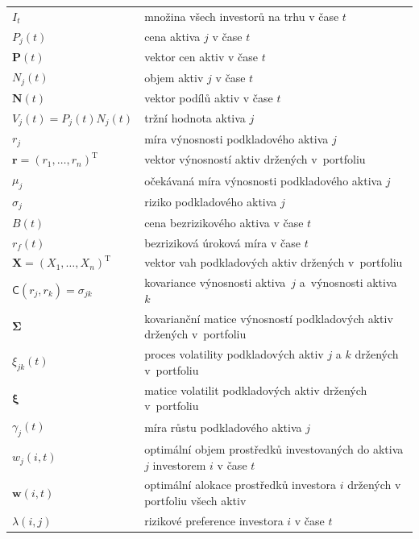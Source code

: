 \documentclass[a4paper,12pt]{report}
\theoremstyle{definition} \newtheorem{definice}[veta]{Definice}
\theoremstyle{remark}
\begin{document}
   \begin{tabular}{p{4cm} p{9.3cm}}
   $I_t$ 								& množina všech investorů na trhu v čase $t$\\
   $P_j(t)$                             &   cena aktiva $j$ v čase $t$ \\
   $\boldsymbol{P}(t)$                             &   vektor cen aktiv v čase $t$\\
   $N_j(t)$                             &   objem aktiv $j$ v čase $t$ \\
   $\boldsymbol{N}(t)$     &   vektor podílů aktiv v čase $t$\\
   $V_j(t)=P_j(t)N_j(t)$       &  tržní hodnota aktiva $j$\\
   $r_j$  								& míra výnosnosti podkladového aktiva $j$\\
   $\boldsymbol{r}=(r_1,\dots,r_n)^\mathrm{T}$  		& vektor výnosností aktiv držených v~portfoliu\\
   $\mu_j$ 								& očekávaná míra výnosnosti podkladového aktiva $j$\\
   $\sigma_j$								& riziko podkladového aktiva $j$\\
   $B(t)$ 								& cena bezrizikového aktiva v čase $t$\\
   $r_f(t)$ 								& bezriziková úroková míra v čase $t$\\
   $\boldsymbol{X}=(X_1,\dots,X_n)^\mathrm{T}$		& vektor vah podkladových aktiv držených v~portfoliu\\
   $\mathsf{C}(r_j,r_k)=\sigma_{jk}$				& kovariance výnosnosti aktiva~$j$ a~výnosnosti aktiva~$k$\\
   $\boldsymbol{\Sigma}$						& kovarianční matice výnosností podkladových aktiv držených v~portfoliu\\
   $\xi_{jk}(t)$ 							& proces volatility podkladových aktiv $j$ a $k$ držených v~portfoliu\\
   $\boldsymbol{\xi}$						& matice volatilit podkladových aktiv držených v~portfoliu\\
   $\gamma_j(t)$ 							& míra růstu  podkladového aktiva $j$\\
   $w_{j}(i,t)$ 							& optimální objem prostředků investovaných do aktiva $j$ investorem $i$ v čase $t$\\
   $\boldsymbol{w}(i,t)$					 	& optimální alokace prostředků investora $i$ držených v portfoliu všech aktiv\\
   $\lambda(i,j)$							& rizikové preference investora $i$ v čase $t$ \\  
\end{tabular}\\\\\\
%
%
%
\end{document}

